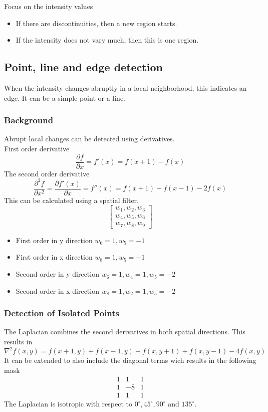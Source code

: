 Focus on the intensity values
\begin{itemize}
\item If there are discontinuities, then a new region starts.
\item If the intensity does not vary much, then this is one region.
\end{itemize}

\subsection{Point, line and edge detection}

When the intensity changes abruptly in a local neighborhood, this indicates an edge. It can be a simple point or a line.

\subsubsection{Background}

Abrupt local changes can be detected using derivatives.\\
First order derivative
\[
	\frac{\partial f}{\partial x} = f'(x)=f(x+1)-f(x)
\]
The second order derivative
\[
	\frac{\partial^2f}{\partial x^2}=\frac{\partial f'(x)}{\partial x}=f''(x)=f(x+1)+f(x-1)-2f(x)
\]
This can be calculated using a spatial filter.
\[
	\begin{bmatrix}
	w_1, w_2, w_3\\
	w_4, w_5, w_6\\
	w_7, w_8, w_9
	\end{bmatrix}
\]
\begin{itemize}
\item First order in y direction $w_6=1, w_5=-1$
\item First order in x direction $w_8=1, w_5=-1$
\item Second order in y direction $w_6=1, w_4=1, w_5=-2$
\item Second order in x direction $w_8=1, w_2=1, w_5=-2$
\end{itemize}
\subsubsection{Detection of Isolated Points}
The Laplacian combines the second derivatives in both spatial directions. This results in
\[
	\nabla^2f(x,y)=f(x+1,y)+f(x-1,y)+f(x,y+1)+f(x,y-1)-4f(x,y)
\]
It can be extended to also include the diagonal terms wich results in the following mask
\[
	\begin{matrix}
	 1 & 1 & 1\\
	 1 & -8 & 1\\
	 1 & 1 & 1
	\end{matrix}
\]
The Laplacian is isotropic with respect to $0^\circ, 45^\circ, 90^\circ \text{ and } 135^\circ$. \\


